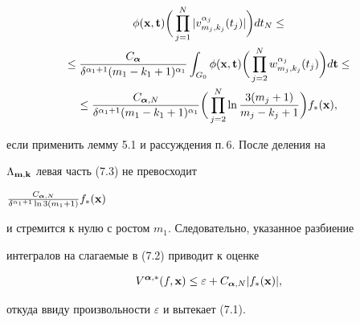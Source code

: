 \begin{pf}
\begin{multline}
\phi ({\bold x},{\bold t})\bigg(\prod_{j=1}^N |v_{m_j,k_j}^{\alpha_j}(t_j)|


\bigg)dt_N \le \\


%


\le\frac{C_{\boldsymbol {\alpha}}}{\delta^{\alpha_1 +1} (m_1-k_1+1)^{\alpha_1 }}


\int_{G_0}\phi ({\bold x},{\bold t})\bigg(\prod_{j=2}^N


w_{m_j,k_j}^{\alpha_j}(t_j)\bigg)d{\bold t}\le \\


%


\le \frac{C_{{\boldsymbol {\alpha}},N}}{\delta^{\alpha_1 +1} (m_1-k_1+1)^{\alpha_1}}


\bigg(\prod_{j=2}^N \ln \frac{3(m_j+1)}{m_j-k_j+1}\bigg) f_*({\bold x}),


\end{multline}


если применить лемму 5.1 и рассуждения п.\,6. После деления на


$\Lambda_{{\bold m},{\bold k}}$ левая часть (7.3) не превосходит 


$\frac{C_{{\boldsymbol {\alpha}},N}}{\delta^{\alpha_1 +1}\ln 3(m_1+1)}f_*({\bold x})$


и стремится к нулю с ростом $m_1$. Следовательно, указанное разбиение


интегралов на слагаемые в (7.2) приводит к оценке


$$


V^{{\boldsymbol {\alpha}},*}(f,{\bold x})\le


\varepsilon+C_{{\boldsymbol {\alpha}},N}|f_*({\bold x})|,


$$


откуда ввиду произвольности $\varepsilon$ и вытекает (7.1).


\end{pf}





\addtocounter{section}{1}


\setcounter{equation}{0}


\setcounter{lems}{0}


\setcounter{thms}{0}








